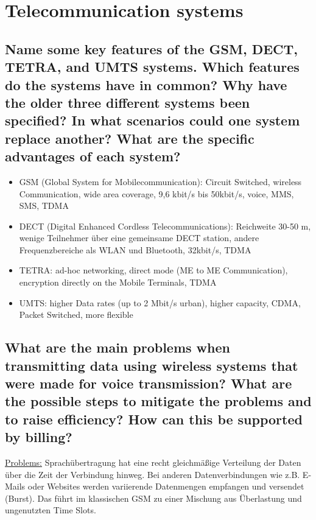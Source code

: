 \section{Telecommunication systems}

\subsection{Name some key features of the GSM, DECT, TETRA, and UMTS systems. Which features do the systems have in common? Why have the older three different systems been specified? In what scenarios could one system replace another? What are the specific advantages of each system?}
\begin{itemize}

\item GSM (Global System for Mobilecommunication): Circuit Switched, wireless Communication, wide area coverage, 9,6 kbit/s bis 50kbit/s, voice, MMS, SMS, TDMA

\item DECT (Digital Enhanced Cordless Telecommunications): Reichweite 30-50 m, wenige Teilnehmer über eine gemeinsame DECT station, andere Frequenzbereiche als WLAN und Bluetooth, 32kbit/s, TDMA

\item TETRA: ad-hoc networking, direct mode (ME to ME Communication), encryption directly on the Mobile Terminals, TDMA

\item UMTS: higher Data rates (up to 2 Mbit/s urban), higher capacity, CDMA, Packet Switched, more flexible

\end{itemize}



\subsection{What are the main problems when transmitting data using wireless systems that were made for voice transmission? What are the possible steps to mitigate the problems and to raise efficiency? How can this be supported by billing?}

\underline{Problems:} Sprachübertragung hat eine recht gleichmäßige Verteilung der Daten über die Zeit der Verbindung hinweg. Bei anderen Datenverbindungen wie z.B. E-Mails oder Websites werden variierende Datenmengen empfangen und versendet (Burst). Das führt im klassischen GSM zu einer Mischung aus Überlastung und ungenutzten Time Slots.

